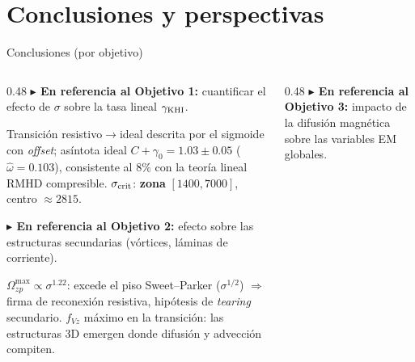 \documentclass[aspectratio=169,9pt]{beamer}
\begin{document}
\section{Conclusiones y perspectivas}

\begin{frame}{Conclusiones (por objetivo)}
\begin{columns}[T]
\begin{column}{0.48\textwidth}
  {\tiny\color{violet}\textbf{$\blacktriangleright$ En referencia al Objetivo 1:}
   cuantificar el efecto de $\sigma$ sobre la tasa lineal $\gamma_{\rm KHI}$.}\\[2pt]
  \begin{tcolorbox}[EQ={1 · Tasa de crecimiento vs.\ resistividad}]
    \scriptsize
    Transici\'on resistivo$\to$ideal descrita por el sigmoide con
    \emph{offset}; as\'intota ideal $C+\gamma_0=1.03\pm0.05$
    ($\hat\omega=0.103$), consistente al $8\%$ con la teor\'ia lineal RMHD
    compresible. $\sigma_{\rm crit}$: \textbf{zona} $[1400,7000]$,
    centro $\approx2815$.
  \end{tcolorbox}
  \pause\vspace{0.08cm}
  {\tiny\color{violet}\textbf{$\blacktriangleright$ En referencia al Objetivo 2:}
   efecto sobre las estructuras secundarias (v\'ortices, l\'aminas de corriente).}\\[2pt]
  \begin{tcolorbox}[EQ={2 · Estructuras secundarias}]
    \scriptsize
    $\Omega^{\max}_{zp}\propto\sigma^{1.22}$: excede el piso Sweet--Parker
    ($\sigma^{1/2}$) $\Rightarrow$ firma de reconexi\'on resistiva,
    hip\'otesis de \textit{tearing} secundario. $f_{Vz}$ m\'aximo en la
    transici\'on: las estructuras 3D emergen donde difusi\'on y advecci\'on
    compiten.
  \end{tcolorbox}
\end{column}
\begin{column}{0.48\textwidth}
  \pause
  {\tiny\color{violet}\textbf{$\blacktriangleright$ En referencia al Objetivo 3:}
   impacto de la difusi\'on magn\'etica sobre las variables EM globales.}\\[2pt]
  \begin{tcolorbox}[EQ={3 · Variables globales}]

\end{tcolorbox}
\end{column}
\end{columns}
\end{frame}
\end{document}
